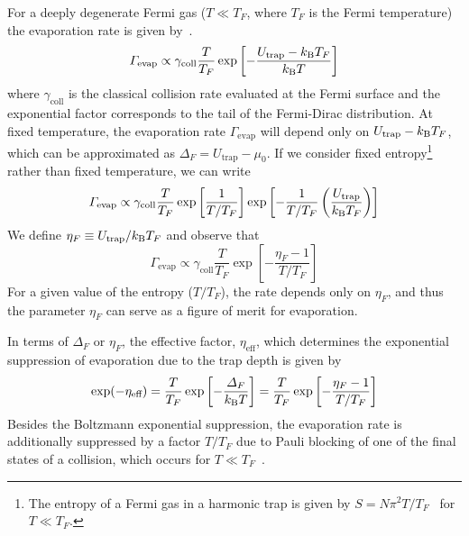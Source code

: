 \begin{itemize}
For a deeply degenerate Fermi gas ($T \ll T_{F}$, where $T_{F}$ is the Fermi
temperature) the evaporation rate is given by~\cite{OHara2001PRAb}.
\begin{equation}
  \Gamma_{\text{evap}} \propto \gamma_{\text{coll}} \frac{T}{T_{F}} 
  \exp\left[ -   
  \frac{ U_{\text{trap}} - k_{\mathrm{B}} T_{F} }{ k_{\mathrm{B}} T }  \right ] 
\end{equation}
where $\gamma_{\text{coll}}$ is the classical collision rate evaluated at the
Fermi surface and the exponential factor corresponds to the tail of the
Fermi-Dirac distribution.   At fixed temperature, the evaporation rate
$\Gamma_{\text{evap}}$ will depend only on $U_{\text{trap}} - k_{\mathrm{B}} T_{F}$, which
can be approximated as   $\Delta_{F} = U_{\text{trap}} - \mu_{0}$.   If we
consider fixed entropy\footnote{The entropy of a Fermi gas in a harmonic trap
is given by $S=N\pi^{2} T/T_{F}$~\cite{Kohl2006} for $T\ll T_{F}$.} rather than
fixed temperature, we can write  
\begin{equation}
  \Gamma_{\text{evap}} \propto \gamma_{\text{coll}} \frac{T}{T_{F}}
  \exp\left[ \frac{1}{T/T_{F}} \right]  
  \exp\left[ -  \frac{1}{T/T_{F}} \left( \frac{U_{\text{trap}}}{k_{\mathrm{B}} T_{F}} \right) \right] 
\end{equation}
We define $ \eta_{F} \equiv U_{\text{trap}}/k_{\mathrm{B}} T_{F}$ and observe that 
\begin{equation}
  \Gamma_{\text{evap}} \propto \gamma_{\text{coll}} \frac{T}{T_{F}}
  \exp\left[ -  \frac{\eta_{F} - 1 }{ T/T_{F} } \right]
\end{equation}
For a given value of the entropy ($T/T_{F}$), the rate depends only on
$\eta_{F}$,  and thus the parameter $\eta_{F}$ can serve as a figure of merit
for evaporation. 

In terms of $\Delta_{F}$ or $\eta_{F}$,  the effective factor,
$\eta_{\text{eff}}$, which determines the exponential suppression of
evaporation due to the trap depth is given by
\begin{equation}
 \exp(-\eta_{\text{eff}})  
  =  \frac{T}{T_{F}} \exp \left[ - \frac{ \Delta_{F} }{ k_{\mathrm{B}} T} \right]
  =  \frac{T}{T_{F}} \exp\left[- \frac{\eta_{F} - 1 }{T/T_{F} } \right]
\end{equation}
Besides the Boltzmann exponential suppression, the evaporation rate is
additionally suppressed by a factor $T/T_{F}$ due to Pauli blocking of one of
the final states of a collision, which occurs for $T\ll
T_{F}$~\cite{OHara2001PRAb}.    

\end{itemize}

